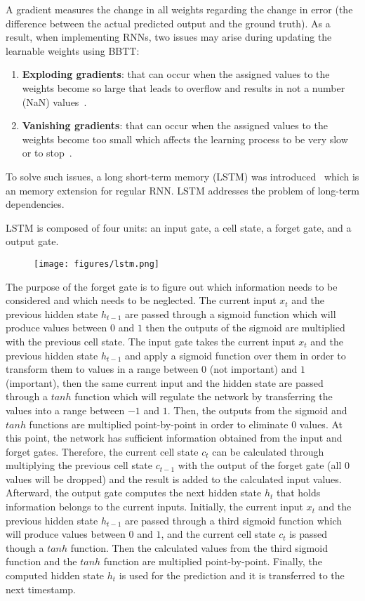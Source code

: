 A gradient measures the change in all weights regarding the change in error (the difference between the actual predicted output and the ground truth).
As a result, when implementing RNNs, two issues may arise during updating the learnable weights using BBTT:
\begin{enumerate}
	\item \textbf{Exploding gradients}: that can occur when the assigned values to the weights become so large that leads to overflow and results in not a number (NaN) values~\cite{Brownlee2017a}.
	\item \textbf{Vanishing gradients}: that can occur when the assigned values to the weights become too small which affects the learning process to be very slow or to stop~\cite{Brownlee2017a}.
\end{enumerate}
To solve such issues, a long short-term memory (LSTM)  was introduced~\cite{Hochreiter1997} which is an memory extension for regular RNN.
LSTM addresses the problem of long-term dependencies.

LSTM is composed of four units: an input gate, a cell state, a forget gate, and a output gate.
\begin{figure}
	\begin{center}
		\texttt{[image: figures/lstm.png]}
	\end{center}
	\label{lstm}
\end{figure}
The purpose of the forget gate is to figure out which information needs to be considered and which needs to be neglected.
The current input \(x_t\) and the previous hidden state \(h_{t-1}\) are passed through a sigmoid function which will produce values between \(0\) and \(1\) then the outputs of the sigmoid are multiplied with the previous cell state.
The input gate takes the current input \(x_t\) and the previous hidden state \(h_{t-1}\) and apply a sigmoid function over them in order to transform them to values in a range between \(0\) (not important) and \(1\) (important), then the same current input and the hidden state are passed through a \(tanh\) function which will regulate the network by transferring the values into a range between \(-1\) and \(1\).
Then, the outputs from the sigmoid and \(tanh\) functions are multiplied point-by-point in order to eliminate \(0\) values.
At this point, the network has sufficient information obtained from the input and forget gates.
Therefore, the current cell state \(c_t\) can be calculated through multiplying the previous cell state \(c_{t-1}\) with the output of the forget gate (all 0 values will be dropped) and the result is added to the calculated input values.
Afterward, the output gate computes the next hidden state \(h_t\) that holds information belongs to the current inputs.
Initially, the current input \(x_t\) and the previous hidden state \(h_{t-1}\) are passed through a third sigmoid function which will produce values between 
\(0\) and \(1\), and the current cell state \(c_t\) is passed though a \(tanh\) function.
Then the calculated values from the third sigmoid function and the \(tanh\) function are multiplied point-by-point.
Finally, the computed hidden state \(h_t\) is used for the prediction and it is transferred to the next timestamp.